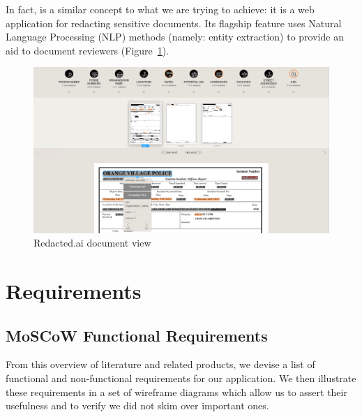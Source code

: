 \documentclass[\version]{l4proj}
\begin{document}
In fact, \textcite{RedactedAIRemovea} is a similar concept to what we are trying to achieve: it is a web application for redacting sensitive documents. Its flagship feature uses Natural Language Processing (NLP) methods (namely: entity extraction) to provide an aid to document reviewers (Figure~\ref{fig:redactedai}).

\begin{figure}[H]
    \centering
    \includegraphics[width=0.9\linewidth]{images/related_products/redactedai.png}
    \caption{Redacted.ai document view}\label{fig:redactedai}
\end{figure}

\chapter{Requirements}

\section{MoSCoW Functional Requirements}

From this overview of literature and related products, we devise a list of functional and non-functional requirements for our application.
We then illustrate these requirements in a set of wireframe diagrams which allow us to assert their usefulness and to verify we did not skim over important ones.
\end{document}
